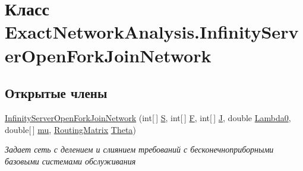 \hypertarget{class_exact_network_analysis_1_1_infinity_server_open_fork_join_network}{}\section{Класс Exact\+Network\+Analysis.\+Infinity\+Server\+Open\+Fork\+Join\+Network}
\label{class_exact_network_analysis_1_1_infinity_server_open_fork_join_network}
\subsection*{Открытые члены}
\begin{DoxyCompactItemize}
\item 
\hyperlink{class_exact_network_analysis_1_1_infinity_server_open_fork_join_network_aa68fa7a62d49fc7f9add83dde539fc09}{Infinity\+Server\+Open\+Fork\+Join\+Network} (int\mbox{[}$\,$\mbox{]} \hyperlink{class_exact_network_analysis_1_1_infinity_server_open_fork_join_network_ac72550bd668cf8677c84d4af4c80d905}{S}, int\mbox{[}$\,$\mbox{]} \hyperlink{class_exact_network_analysis_1_1_infinity_server_open_fork_join_network_a7fb7c18d2fb5cf56cb6835c4841cfd0c}{F}, int\mbox{[}$\,$\mbox{]} \hyperlink{class_exact_network_analysis_1_1_infinity_server_open_fork_join_network_a31fdadd622edf1475c3f31cd61c39ea4}{J}, double \hyperlink{class_exact_network_analysis_1_1_infinity_server_open_fork_join_network_adaf8966418503408bfe47db8bd365ea1}{Lambda0}, double\mbox{[}$\,$\mbox{]} \hyperlink{class_exact_network_analysis_1_1_infinity_server_open_fork_join_network_aa234d13b5de6baaeae5f10d5e88c0a6b}{mu}, \hyperlink{class_network_descriptions_1_1_routing_matrix}{Routing\+Matrix} \hyperlink{class_exact_network_analysis_1_1_infinity_server_open_fork_join_network_a1b837b250c20167a9ac7391fc6bd714e}{Theta})
\begin{DoxyCompactList}\small\item\em Задает сеть с делением и слиянием требований с бесконечноприборными базовыми системами обслуживания \end{DoxyCompactList}\end{DoxyCompactItemize}
